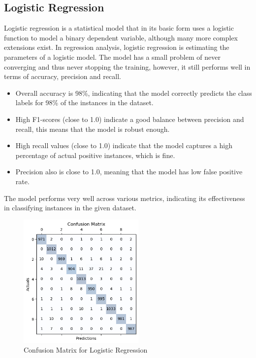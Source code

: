 \documentclass{article}
\begin{document}
\begin{titlepage}
  \section{Logistic Regression}
  Logistic regression is a statistical model that in its basic form uses a logistic function to model a binary dependent variable, although many more complex extensions exist. In regression analysis, logistic regression is estimating the parameters of a logistic model.
  \newline
  \newline
  The model has a small problem of never converging and thus never stopping the training, however, it still performs well in terms of accuracy, precision and recall.

  \begin{itemize}
    \item Overall accuracy is 98\%, indicating that the model correctly predicts the class labels for 98\% of the instances in the dataset.
    \item High F1-scores (close to 1.0) indicate a good balance between precision and recall, this means that the model is robust enough.
    \item High recall values (close to 1.0) indicate that the model captures a high percentage of actual positive instances, which is fine.
    \item Precision also is close to 1.0, meaning that the model has low false positive rate.
  \end{itemize}

  The model performs very well across various metrics, indicating its effectiveness in classifying instances in the given dataset.
  \newline
  \newline

  \begin{figure}[htbp]
    \centering
    \includegraphics[width=0.55\textwidth]{LRCM.png}
    \caption{Confusion Matrix for Logistic Regression}
    \label{fig:sample3}
  \end{figure}


\end{titlepage}
\end{document}
